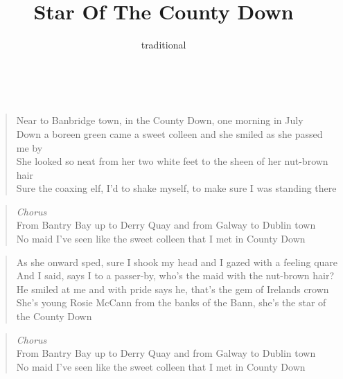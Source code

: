 \documentclass[9pt,a4paper,oneside, onecolumn]{article}
\author{traditional}
\title{Star Of The County Down}
\date{}
\begin{document}
\maketitle
\thispagestyle{empty}

\mbox{
}\\


\begin{verse}
Near to Banbridge town, in the County Down, one morning in July\\
Down a boreen green came a sweet colleen and she smiled as she passed me by\\
She looked so neat from her two white feet to the sheen of her nut-brown hair\\
Sure the coaxing elf, I'd to shake myself, to make sure I was standing there\\
\end{verse}

\begin{verse}
\textit{Chorus}\\
From Bantry Bay up to Derry Quay and from Galway to Dublin town\\
No maid I've seen like the sweet colleen that I met in County Down\\
\end{verse}

\begin{verse}
As she onward sped, sure I shook my head and I gazed with a feeling quare\\
And I said, says I to a passer-by, who's the maid with the nut-brown hair?\\
He smiled at me and with pride says he, that's the gem of Irelands crown\\
She's young Rosie McCann from the banks of the Bann, she's the star of the County Down \\
\end{verse}

\begin{verse}
\textit{Chorus}\\
From Bantry Bay up to Derry Quay and from Galway to Dublin town\\
No maid I've seen like the sweet colleen that I met in County Down\\
\end{verse}
\end{document}
